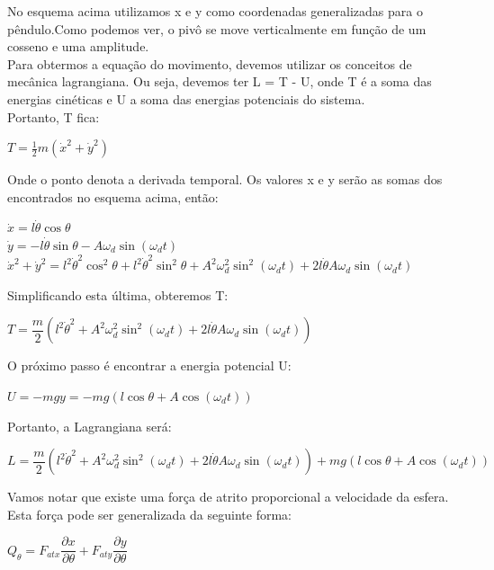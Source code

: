 \documentclass[13pt,a4paper]{report}
\begin{document}
No esquema acima utilizamos x e y como coordenadas generalizadas para o pêndulo.Como podemos ver, o pivô se move verticalmente em função de um cosseno e uma amplitude.
\\

Para obtermos a equação do movimento, devemos utilizar os conceitos de mecânica lagrangiana. Ou seja, devemos ter L = T - U, onde T é a soma das energias cinéticas e U a soma das energias potenciais do sistema.
\\
Portanto, T fica:
\begin{center}
$
 T = \frac{1}{2}m(\dot{x}^{2} + \dot{y}^{2})
$
\end{center}

Onde o ponto denota a derivada temporal. Os valores x e y serão as somas dos encontrados no esquema acima, então:

\begin{center}
$
	\dot{x} = l\dot{\theta}\cos\theta	
$
\\[2mm]
$
	\dot{y} = - l\dot{\theta}\sin\theta -A\omega_{d}\sin(\omega_{d} t)
$
\\[2mm]
$
	\dot{x}^{2} + \dot{y}^{2} = l^{2}\dot{\theta}^{2}\cos^{2}\theta	
	+ l^{2}\dot{\theta}^{2}\sin^{2}\theta	
	+ A^{2}\omega_{d}^{2}\sin^{2}(\omega_{d} t)
	+ 2l\dot{\theta}A\omega_{d}\sin(\omega_{d} t)
$
\end{center}

Simplificando esta última, obteremos T:
\begin{center}
$
	T = \dfrac{m}{2}
	( l^{2}\dot{\theta}^{2} 
	  + A^{2}\omega_{d}^{2}\sin^{2}(\omega_{d} t)
	  + 2l\dot{\theta}A\omega_{d}\sin(\omega_{d} t)
	)
$
\end{center}

O próximo passo é encontrar a energia potencial U:
\begin{center}
$
 U = -mgy = 	-mg(l\cos\theta + A\cos(\omega_{d} t))
$
\end{center}

Portanto, a Lagrangiana será:
\begin{center}
$
 L = \dfrac{m}{2}
	( l^{2}\dot{\theta}^{2} 
	  + A^{2}\omega_{d}^{2}\sin^{2}(\omega_{d} t)
	  + 2l\dot{\theta}A\omega_{d}\sin(\omega_{d} t)
 ) + mg(l\cos\theta + A\cos(\omega_{d} t))
$
\end{center}

Vamos notar que existe uma força de atrito proporcional a velocidade da esfera. Esta força pode ser generalizada da seguinte forma:
\\
\begin{center}
$
 Q_{\theta} = F_{atx}\dfrac{\partial x}{\partial \theta}
 			  + F_{aty}\dfrac{\partial y}{\partial \theta}
$
\end{center}
\clearpage
\end{document}
